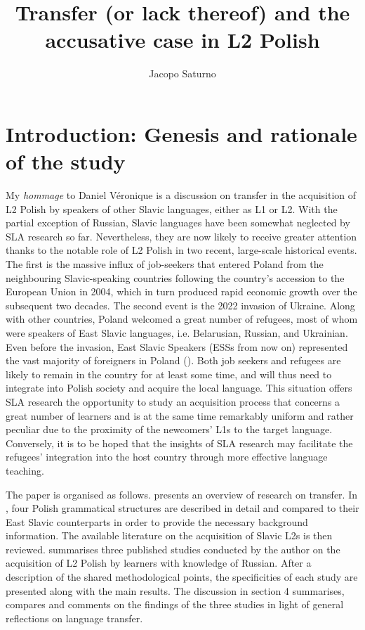 \documentclass[output=paper,            colorlinks, citecolor=brown            		  ]{langscibook}
\author{Jacopo Saturno\orcid{}\affiliation{University of Bergamo}}
\title{Transfer (or lack thereof) and the accusative case in L2 Polish}
\begin{document}
\AffiliationsWithoutIndexing{}
\maketitle 



\section{Introduction: Genesis and rationale of the study}

My \textit{hommage} to Daniel Véronique is a discussion on transfer in the acquisition of L2 Polish by speakers of other Slavic languages, either as L1 or L2. With the partial exception of Russian, Slavic languages have been somewhat neglected by SLA research so far. Nevertheless, they are now likely to receive greater attention thanks to the notable role of L2 Polish in two recent, large-scale historical events. The first is the massive influx of job-seekers that entered Poland from the neighbouring Slavic-speaking countries following the country’s accession to the European Union in 2004, which in turn produced rapid economic growth over the subsequent two decades. The second event is the 2022 invasion of Ukraine. Along with other countries, Poland welcomed a great number of refugees, most of whom were speakers of East Slavic languages, i.e. Belarusian, Russian, and Ukrainian. Even before the invasion, East Slavic Speakers (ESSs from now on) represented the vast majority of foreigners in Poland (\citealt{GlownyUrzadStatystyczny2020a,GlownyUrzadStatystyczny2020b, GlownyUrzadStatystyczny2021}). Both job seekers and refugees are likely to remain in the country for at least some time, and will thus need to integrate into Polish society and acquire the local language. This situation offers SLA research the opportunity to study an acquisition process that concerns a great number of learners and is at the same time remarkably uniform and rather peculiar due to the proximity of the newcomers’ L1s to the target language. Conversely, it is to be hoped that the insights of SLA research may facilitate the refugees’ integration into the host country through more effective language teaching.

The paper is organised as follows.  presents an overview of research on transfer. In , four Polish grammatical structures are described in detail and compared to their East Slavic counterparts in order to provide the necessary background information. The available literature on the acquisition of Slavic L2s is then reviewed.  summarises three published studies conducted by the author on the acquisition of L2 Polish by learners with knowledge of Russian. After a description of the shared methodological points, the specificities of each study are presented along with the main results. The discussion in section 4 summarises, compares and comments on the findings of the three studies in light of general reflections on language transfer. 
\end{document}
